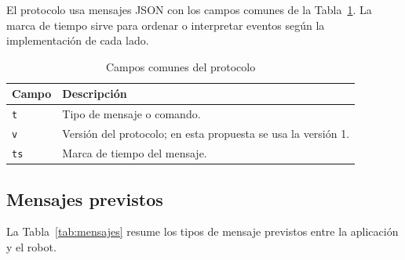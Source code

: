 \documentclass[journal]{IEEEtran}
\begin{document}
El protocolo usa mensajes JSON con los campos comunes de la Tabla~\ref{tab:campos}. La marca de tiempo sirve para ordenar o interpretar eventos según la implementación de cada lado.

\begin{table}[H]
\centering
\caption{Campos comunes del protocolo}
\label{tab:campos}
\scriptsize
\begin{tabular}{p{} p{}}
\toprule
\textbf{Campo} & \textbf{Descripción} \\
\midrule
\texttt{t} & Tipo de mensaje o comando. \\
\texttt{v} & Versión del protocolo; en esta propuesta se usa la versión 1. \\
\texttt{ts} & Marca de tiempo del mensaje. \\
\bottomrule
\end{tabular}
\end{table}

\subsection{Mensajes previstos}

La Tabla~\ref{tab:mensajes} resume los tipos de mensaje previstos entre la aplicación y el robot.
\end{document}
